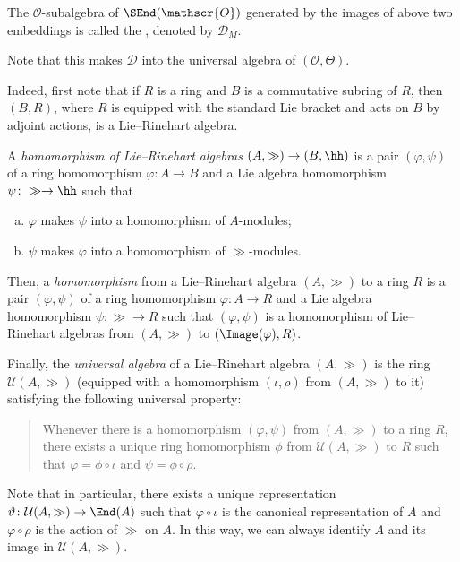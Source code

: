 \begin{defn}
The $\mathscr{O}$-subalgebra of $\SEnd(\mathscr{O})$ generated by 
the images of above two embeddings is called the 
, denoted by $\mathscr{D}_M$.
\end{defn}
Note that this makes $\mathscr{D}$ into the universal algebra of 
$(\mathscr{O},\Theta)$. 

\begin{Rem}
\small
Indeed, first note that if $R$ is a ring and 
$B$ is a commutative subring of $R$, 
then $(B,R)$, where $R$ is equipped with the standard Lie bracket and 
acts on $B$ by adjoint actions, is a Lie–Rinehart algebra.

A \emph{homomorphism of Lie–Rinehart algebras} $(A,\gg)\to(B,\hh)$ is 
a pair $(\varphi,\psi)$ of a ring homomorphism $\varphi\colon A\to B$ and 
a Lie algebra homomorphism $\psi\colon\gg\to\hh$ such that 
\begin{enumerate}[(a)]
\item $\varphi$ makes $\psi$ into a homomorphism of $A$-modules;
\item $\psi$ makes $\varphi$ into a homomorphism of $\gg$-modules.
\end{enumerate}

Then, a \emph{homomorphism} from a Lie–Rinehart algebra $(A,\gg)$ to 
a ring $R$ is a pair $(\varphi,\psi)$ of 
a ring homomorphism $\varphi\colon A\to R$ and 
a Lie algebra homomorphism $\psi\colon\gg\to R$ such that 
$(\varphi,\psi)$ is a homomorphism of Lie–Rinehart algebras 
from $(A,\gg)$ to $(\Image(\varphi),R)$. 

Finally, the \emph{universal algebra} of a Lie–Rinehart algebra $(A,\gg)$ is 
the ring $\mathcal{U}(A,\gg)$ (equipped with a homomorphism 
$(\iota,\rho)$ from $(A,\gg)$ to it) 
satisfying the following universal property: 
\begin{quote}
Whenever there is a homomorphism $(\varphi,\psi)$ from $(A,\gg)$ to a ring $R$, 
there exists a unique ring homomorphism $\phi$ from $\mathcal{U}(A,\gg)$ to $R$ 
such that $\varphi=\phi\circ\iota$ and $\psi=\phi\circ\rho$.
\end{quote}
Note that in particular, 
there exists a unique representation 
$\vartheta\colon\mathcal{U}(A,\gg)\to\End(A)$ such that 
$\varphi\circ\iota$ is the canonical representation of $A$ and 
$\varphi\circ\rho$ is the action of $\gg$ on $A$. 
In this way, we can always identify $A$ and its image in $\mathcal{U}(A,\gg)$. 
\end{Rem}

